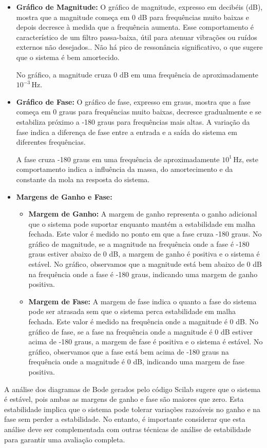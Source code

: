 \begin{itemize}
    \item \textbf{Gráfico de Magnitude:}
          O gráfico de magnitude, expresso em decibéis (dB), mostra que a magnitude começa em 0 dB para frequências muito baixas e depois decresce à medida que a frequência aumenta. Esse comportamento é característico de um filtro passa-baixa, útil para atenuar vibrações ou ruídos externos não desejados.. Não há pico de ressonância significativo, o que sugere que o sistema é bem amortecido.

          No gráfico, a magnitude cruza 0 dB em uma frequência de aproximadamente \(10^{-3} \, \text{Hz}\).

    \item \textbf{Gráfico de Fase:}
          O gráfico de fase, expresso em graus, mostra que a fase começa em 0 graus para frequências muito baixas, decresce gradualmente e se estabiliza próximo a -180 graus para frequências mais altas. A variação da fase indica a diferença de fase entre a entrada e a saída do sistema em diferentes frequências.

          A fase cruza -180 graus em uma frequência de aproximadamente \(10^1 \, \text{Hz}\), este comportamento indica a influência da massa, do amortecimento e da constante da mola na resposta do sistema.
    \item \textbf{Margens de Ganho e Fase:}
          \begin{itemize}
              \item \textbf{Margem de Ganho:} A margem de ganho representa o ganho adicional que o sistema pode suportar enquanto mantém a estabilidade em malha fechada. Este valor é medido no ponto em que a fase cruza -180 graus. No gráfico de magnitude, se a magnitude na frequência onde a fase é -180 graus estiver abaixo de 0 dB, a margem de ganho é positiva e o sistema é estável. No gráfico, observamos que a magnitude está bem abaixo de 0 dB na frequência onde a fase é -180 graus, indicando uma margem de ganho positiva.
              \item \textbf{Margem de Fase:} A margem de fase indica o quanto a fase do sistema pode ser atrasada sem que o sistema perca estabilidade em malha fechada. Este valor é medido na frequência onde a magnitude é 0 dB. No gráfico de fase, se a fase na frequência onde a magnitude é 0 dB estiver acima de -180 graus, a margem de fase é positiva e o sistema é estável. No gráfico, observamos que a fase está bem acima de -180 graus na frequência onde a magnitude é 0 dB, indicando uma margem de fase positiva.
          \end{itemize}
\end{itemize}

A análise dos diagramas de Bode gerados pelo código Scilab sugere que o sistema é estável, pois ambas as margens de ganho e fase são maiores que zero. Esta estabilidade implica que o sistema pode tolerar variações razoáveis no ganho e na fase sem perder a estabilidade. No entanto, é importante considerar que esta análise deve ser complementada com outras técnicas de análise de estabilidade para garantir uma avaliação completa.
